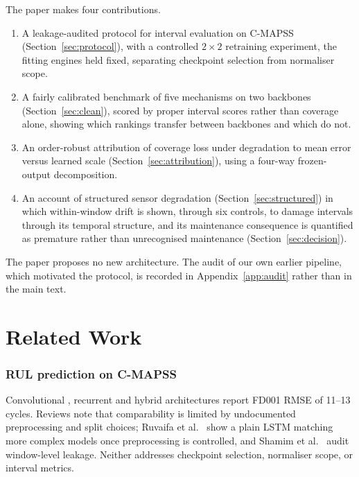 \documentclass[journal]{IEEEtran}
\begin{document}
The paper makes four contributions.
\begin{enumerate}
\item A leakage-audited protocol for interval evaluation on C-MAPSS (Section~\ref{sec:protocol}), with a controlled $2\times2$ retraining experiment, the fitting engines held fixed, separating checkpoint selection from normaliser scope.
\item A fairly calibrated benchmark of five mechanisms on two backbones (Section~\ref{sec:clean}), scored by proper interval scores rather than coverage alone, showing which rankings transfer between backbones and which do not.
\item An order-robust attribution of coverage loss under degradation to mean error versus learned scale (Section~\ref{sec:attribution}), using a four-way frozen-output decomposition.
\item An account of structured sensor degradation (Section~\ref{sec:structured}) in which within-window drift is shown, through six controls, to damage intervals through its temporal structure, and its maintenance consequence is quantified as premature rather than unrecognised maintenance (Section~\ref{sec:decision}).
\end{enumerate}
The paper proposes no new architecture. The audit of our own earlier pipeline, which motivated the protocol, is recorded in Appendix~\ref{app:audit} rather than in the main text.

\section{Related Work}
\label{sec:related}
\subsubsection*{RUL prediction on C-MAPSS}
Convolutional \cite{li2018,li2020}, recurrent \cite{zhang2019} and hybrid \cite{tang2025,chen2024,deng2024} architectures report FD001 RMSE of 11--13 cycles. Reviews \cite{lei2018,zhao2019,liu2025} note that comparability is limited by undocumented preprocessing and split choices; Ruvaifa et al.\ \cite{ruvaifa2026} show a plain LSTM matching more complex models once preprocessing is controlled, and Shamim et al.\ \cite{shamim2026} audit window-level leakage. Neither addresses checkpoint selection, normaliser scope, or interval metrics.
\end{document}
